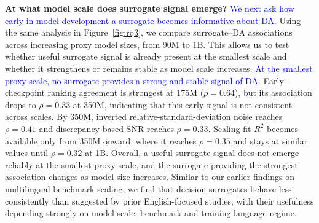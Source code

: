 \textbf{At what model scale does surrogate signal emerge?}
\textcolor{blue}{We next ask how early in model development a surrogate becomes informative about DA.}
Using the same analysis in Figure~\ref{fig:rq3}, we compare surrogate--DA associations across increasing proxy model sizes, from 90M to 1B.
This allows us to test whether useful surrogate signal is already present at the smallest scale and whether it strengthens or remains stable as model scale increases.
\textcolor{blue}{At the smallest proxy scale, no surrogate provides a strong and stable signal of DA.}
Early-checkpoint ranking agreement is strongest at 175M ($\rho=0.64$), but its association drops to $\rho=0.33$ at 350M, indicating that this early signal is not consistent across scales.
By 350M, inverted relative-standard-deviation noise reaches $\rho=0.41$ and discrepancy-based SNR reaches $\rho=0.33$.
Scaling-fit $R^2$ becomes available only from 350M onward, where it reaches $\rho=0.35$ and stays at similar values until $\rho=0.32$ at 1B.
Overall, a useful surrogate signal does not emerge reliably at the smallest proxy scale, and the surrogate providing the strongest association changes as model size increases.
Similar to our earlier findings on multilingual benchmark scaling, we find that decision surrogates behave less consistently than suggested by prior English-focused studies, with their usefulness depending strongly on model scale, benchmark and training-language regime.

